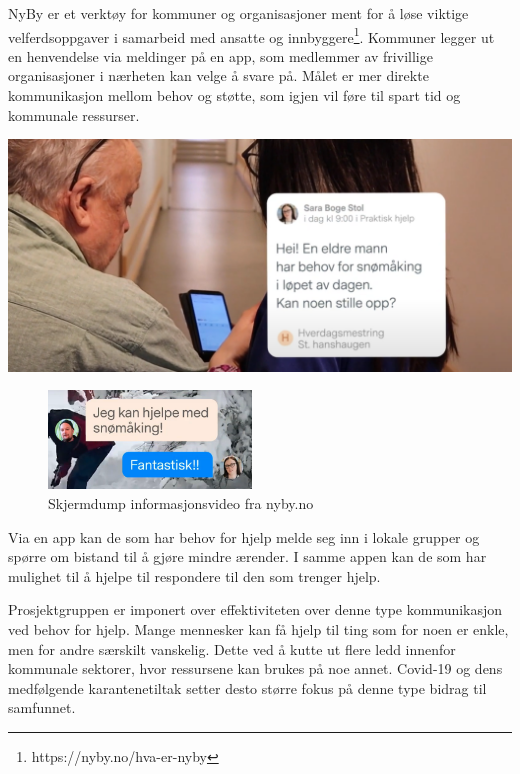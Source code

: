 \newpage

NyBy er et verktøy for kommuner og organisasjoner ment for å løse viktige velferdsoppgaver i samarbeid med ansatte og innbyggere\footnote{https://nyby.no/hva-er-nyby}. Kommuner legger ut en henvendelse via meldinger på en app, som medlemmer av frivillige organisasjoner i nærheten kan velge å svare på. Målet er mer direkte kommunikasjon mellom behov og støtte, som igjen vil føre til spart tid og kommunale ressurser.

\vspace{5mm} %

\includegraphics[width=\textwidth]{Illustrasjoner/andre_platformer/nyby_henvendelse.png}

\vspace{5mm} %
\begin{figure}
  \begin{center}
    \includegraphics[width=0.48\textwidth]{Illustrasjoner/andre_platformer/nyby_svar.png}
  \end{center}
  \caption{Skjermdump informasjonsvideo fra nyby.no}
\end{figure}
Via en app kan de som har behov for hjelp melde seg inn i lokale grupper og spørre om bistand til å gjøre mindre ærender. I samme appen kan de som har mulighet til å hjelpe til respondere til den som trenger hjelp.

\vspace{5mm} %

Prosjektgruppen er imponert over effektiviteten over denne type kommunikasjon ved behov for hjelp. Mange mennesker kan få hjelp til ting som for noen er enkle, men for andre særskilt vanskelig. Dette ved å kutte ut flere ledd innenfor kommunale sektorer, hvor ressursene kan brukes på noe annet. Covid-19 og dens medfølgende karantenetiltak setter desto større fokus på denne type bidrag til samfunnet.


